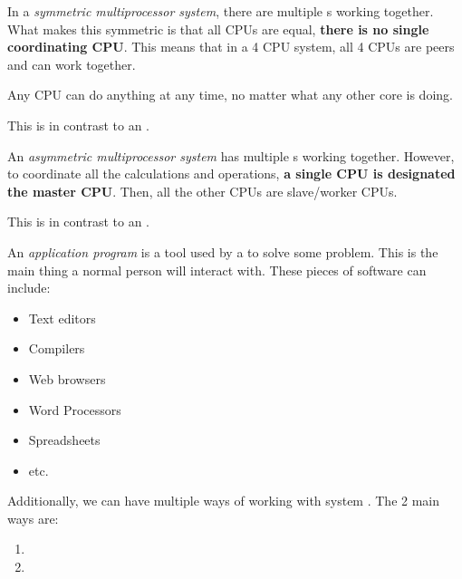 \begin{definition}\label{def:Symmetric_Multiprocessor_System}
  In a \emph{symmetric multiprocessor system}, there are multiple s working together.
  What makes this symmetric is that all CPUs are equal, \textbf{there is no single coordinating CPU}.
  This means that in a 4 CPU system, all 4 CPUs are peers and can work together.

  Any CPU can do anything at any time, no matter what any other core is doing.

  This is in contrast to an .
\end{definition}

\begin{definition}\label{def:Asymmetric_Multiprocessor_System}
  An \emph{asymmetric multiprocessor system} has multiple s working together.
  However, to coordinate all the calculations and operations, \textbf{a single CPU is designated the master CPU}.
  Then, all the other CPUs are slave/worker CPUs.

  This is in contrast to an .
\end{definition}

\begin{definition}\label{def:Application_Program}
  An \emph{application program} is a tool used by a  to solve some problem.
  This is the main thing a normal person will interact with.
  These pieces of software can include:
  \begin{itemize}[noitemsep]
  \item Text editors
  \item Compilers
  \item Web browsers
  \item Word Processors
  \item Spreadsheets
  \item etc.
  \end{itemize}
\end{definition}

Additionally, we can have multiple ways of working with system .
The 2 main ways are:
\begin{enumerate}[noitemsep]
\item {}
\item {}
\end{enumerate}

